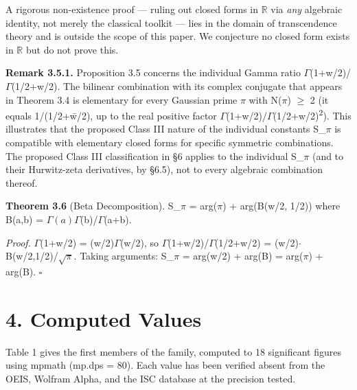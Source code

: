 \documentclass[11pt]{article}
\begin{document}
A rigorous non-existence proof --- ruling out closed forms in \(\mathbb{R}\) via
\emph{any} algebraic identity, not merely the classical toolkit ---
lies in the domain of transcendence theory and is outside the scope of
this paper. We conjecture no closed form exists in \(\mathbb{R}\) but do not
prove this.

\textbf{Remark 3.5.1.} Proposition 3.5 concerns the individual Gamma
ratio \(\Gamma\)(1+w/2)/\(\Gamma\)(1/2+w/2). The bilinear combination
with its complex conjugate that appears in Theorem 3.4 is elementary for
every Gaussian prime \(\pi\) with N(\(\pi\)) \(\geq\) 2 (it equals
1/(1/2+w̄/2), up to the real positive factor
\textbar{}\(\Gamma\)(1+w/2)/\(\Gamma\)(1/2+w/2)\textbar{}\textsuperscript{2}).
This illustrates that the proposed Class III nature of the individual
constants S\_\(\pi\) is compatible with elementary closed forms for
specific symmetric combinations. The proposed Class III classification
in §6 applies to the individual S\_\(\pi\) (and to their Hurwitz-zeta
derivatives, by §6.5), not to every algebraic combination thereof.

\textbf{Theorem 3.6} (Beta Decomposition). S\_\(\pi\) = arg(\(\pi\)) +
arg(B(w/2, 1/2)) where B(a,b) = \(\Gamma(a)\Gamma\)(b)/\(\Gamma\)(a+b).

\emph{Proof.} \(\Gamma\)(1+w/2) = (w/2)\(\Gamma\)(w/2), so
\(\Gamma\)(1+w/2)/\(\Gamma\)(1/2+w/2) =
(w/2)\(\cdot\)B(w/2,1/2)/\(\sqrt{\pi}\). Taking arguments: S\_\(\pi\) =
arg(w/2) + arg(B) = arg(\(\pi\)) + arg(B). \(\square\)

\hypertarget{computed-values}{%
\section{4. Computed Values}\label{computed-values}}

Table 1 gives the first members of the family, computed to 18
significant figures using mpmath (mp.dps = 80). Each value has been
verified absent from the OEIS, Wolfram Alpha, and the ISC database at
the precision tested.
\end{document}
